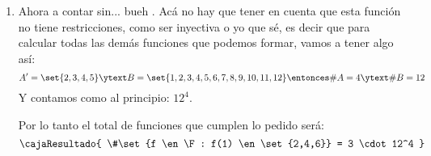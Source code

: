 \begin{enumerate}[label=\roman*)]
\begin{enumerate}[label=\faIcon{calculator}$_{(\arabic*)}$]
          \item Ahora a contar sin... bueh \poo.
                Acá no hay que tener en cuenta que esta función no tiene restricciones, como ser inyectiva o yo que sé, es decir que
                para calcular todas las demás funciones que podemos formar, vamos a tener algo así:
                $$
                  A' = \set{2,3,4,5} \ytext B = \set{1,2,3,4,5,6,7,8,9,10,11,12}
                  \entonces
                  \#A = 4 \ytext \#B = 12
                $$
                Y contamos como al principio: $12^4$.

                \bigskip

                Por lo tanto el total de funciones que cumplen lo pedido será:
                $$
                  \cajaResultado{
                    \#\set{f \en \F : f(1) \en \set{2,4,6}} = 3 \cdot 12^4
                  }
                $$
        \end{enumerate}
\end{enumerate}

\begin{aportes}
  \item {}
  \item {}
\end{aportes}
